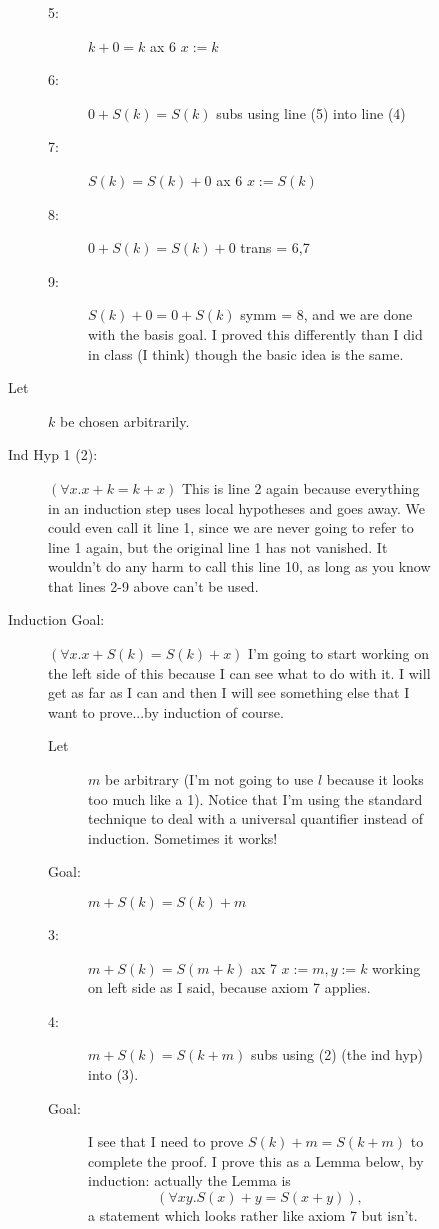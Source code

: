 \documentclass[12pt]{book}
\begin{document}
\begin{description}
\begin{description}
\begin{description}
\begin{description}
\item[5:]  $k+0=k$  ax 6 $x:=k$

\item[6:]  $0+S(k)=S(k)$  subs using line (5) into line (4)

\item[7:]  $S(k)=S(k)+0$  ax 6 $x:=S(k)$

\item[8:]  $0+S(k)=S(k)+0$  trans = 6,7

\item[9:]  $S(k)+0 = 0+S(k)$  symm = 8, and we are done with the basis goal.  I proved this differently than I did in class (I think) though the basic idea is the same.


\end{description}

\item[Let] $k$ be chosen arbitrarily.

\item[Ind Hyp 1 (2):]  $(\forall x.x+k=k+x)$  This is line 2 again because everything in an induction step uses local hypotheses and goes away.  We could even call it line 1, since we are never going to refer to line 1 again, but the original line
1 has not vanished.  It wouldn't do any harm to call this line 10, as long as you know that lines 2-9 above can't be used.

\item[Induction Goal:]  $(\forall x.x+S(k)=S(k)+x)$  I'm going to start working on the left side of this because I can see what to do with it.  I will get as far as I can and then I will see something else that I want to prove...by induction of course.
\begin{description}
\item[Let] $m$ be arbitrary (I'm not going to use $l$ because it looks too much like a 1).  Notice that I'm using the standard technique to deal with a universal quantifier instead of induction.  Sometimes it works!

\item[Goal:]  $m+S(k)=S(k)+m$

\item[3:]  $m+S(k) = S(m+k)$  ax 7 $x:=m, y:=k$  working on left side as I said, because axiom 7 applies.

\item[4:]  $m+S(k)=S(k+m)$  subs using (2) (the ind hyp) into (3).

\item[Goal:]  I see that I need to prove $S(k)+m = S(k+m)$ to complete the proof.  I prove this as a Lemma below, by induction:  actually the Lemma is $$(\forall xy.S(x)+y=S(x+y)),$$a statement which looks rather like axiom 7 but isn't.


\end{description}
\end{description}
\end{description}
\end{description}
\end{document}

